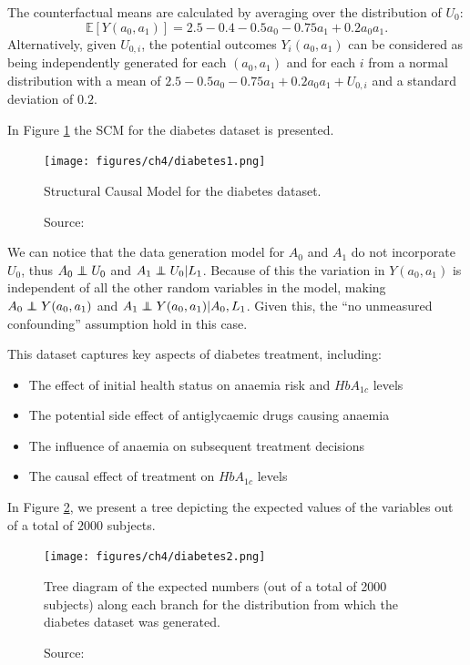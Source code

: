 The counterfactual means are calculated by averaging over the
distribution of \( U_0 \):
\begin{equation}
\mathbb{E}[Y(a_0, a_1)] = 2.5 - 0.4 - 0.5a_0 - 0.75a_1 + 0.2a_0a_1.
\end{equation}
Alternatively, given \( U_{0,i} \), the potential outcomes
\( Y_i(a_0, a_1) \) can be considered as being independently
generated for each \((a_0, a_1)\) and for each \(i\) from
a normal distribution with a mean of
\( 2.5 - 0.5a_0 - 0.75a_1 + 0.2a_0a_1 + U_{0,i} \)
and a standard deviation of $0.2$.

In Figure \ref{fig:diabetes1} the SCM for the diabetes dataset
is presented.
\begin{figure}[h]
    \centering
    \texttt{[image: figures/ch4/diabetes1.png]}
    \caption{Structural Causal Model for the diabetes dataset.}
    \vspace{-10px}
    \caption*{\scriptsize{Source: \cite{sim2012}}}
    \label{fig:diabetes1}
\end{figure}
We can notice that the data generation model for $A_0$ and $A_1$
do not incorporate $U_0$, thus $A_0 \independent U_0$ and
$A_1 \independent U_0 | L_1$. Because of this
the variation in $Y(a_0,a_1)$ is independent
of all the other random variables in the model,
making $A_0 \independent Y(a_0,a_1)$ and
$A_1 \independent Y(a_0,a_1) | A_0, L_1$.
Given this, the ``no unmeasured confounding'' assumption
hold in this case.


This dataset captures key aspects of diabetes treatment, including:
\begin{itemize}
    \item The effect of initial health status on anaemia risk
    and $HbA_{1c}$ levels
    \item The potential side effect of antiglycaemic drugs causing anaemia
    \item The influence of anaemia on subsequent treatment decisions
    \item The causal effect of treatment on $HbA_{1c}$ levels
\end{itemize}
In Figure \ref{fig:diabetes2}, we present a tree
depicting the expected values of the variables out of
a total of $2000$ subjects.

\begin{figure}[h]
    \centering
    \texttt{[image: figures/ch4/diabetes2.png]}
    \caption{Tree diagram of the expected numbers
    (out of a total of 2000 subjects) along each
    branch for the distribution from which the diabetes
    dataset was generated.}
    \vspace{-10px}
    \caption*{\scriptsize{Source: \cite{sim2012}}}
    \label{fig:diabetes2}
\end{figure}

